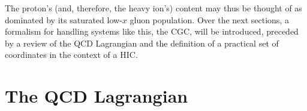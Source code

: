 
The proton's (and, therefore, the heavy ion's) content may thus be thought of as dominated by its saturated low-$x$ gluon population. Over the next sections, a formalism for handling systems like this, the \gls{CGC},  will be introduced, preceded by a review of the \gls{QCD} Lagrangian and the definition of a practical set of coordinates in the context of a \gls{HIC}.

\section{The QCD Lagrangian}

